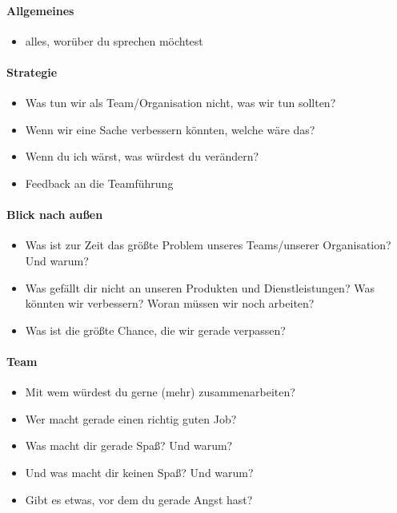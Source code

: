 \paragraph{Allgemeines}
\begin{itemize}
 \item alles, worüber du sprechen möchtest
\end{itemize}

\paragraph{Strategie}
\begin{itemize}
 \item Was tun wir als Team/Organisation nicht, was wir tun sollten?
 \item Wenn wir eine Sache verbessern könnten, welche wäre das?
 \item Wenn du ich wärst, was würdest du verändern?
 \item Feedback an die Teamführung
\end{itemize}

\paragraph{Blick nach außen}
\begin{itemize}
 \item Was ist zur Zeit das größte Problem unseres Teams/unserer Organisation? Und warum?
 \item Was gefällt dir nicht an unseren Produkten und Dienstleistungen? Was könnten wir verbessern? Woran müssen wir noch arbeiten?
 \item Was ist die größte Chance, die wir gerade verpassen?
\end{itemize}

\paragraph{Team}
\begin{itemize}
 \item Mit wem würdest du gerne (mehr) zusammenarbeiten?
 \item Wer macht gerade einen richtig guten Job?
 \item Was macht dir gerade Spaß? Und warum?
 \item Und was macht dir keinen Spaß? Und warum?
 \item Gibt es etwas, vor dem du gerade Angst hast?
\end{itemize}


